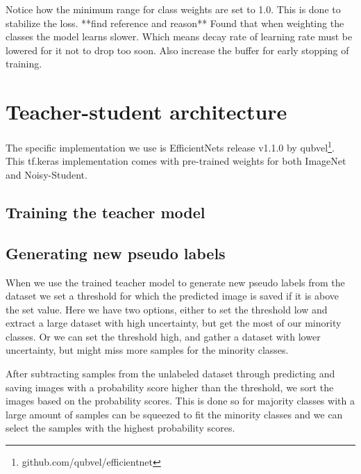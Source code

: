\documentclass[thesis.tex]{subfiles}
\begin{document}
Notice how the minimum range for class weights are set to 1.0. This is done to stabilize the loss. **find reference and reason**
Found that when weighting the classes the model learns slower. Which means decay rate of learning rate must be lowered for it not to drop too soon. Also increase the buffer for early stopping of training.








\section{Teacher-student architecture}

The specific implementation we use is EfficientNets release v1.1.0 by qubvel\footnote{github.com/qubvel/efficientnet}. This tf.keras implementation comes with pre-trained weights for both ImageNet and Noisy-Student.





\subsection{Training the teacher model}






\subsection{Generating new pseudo labels}
When we use the trained teacher model to generate new pseudo labels from the dataset we set a threshold for which the predicted image is saved if it is above the set value. Here we have two options, either to set the threshold low and extract a large dataset with high uncertainty, but get the most of our minority classes. Or we can set the threshold high, and gather a dataset with lower uncertainty, but might miss more samples for the minority classes.

After subtracting samples from the unlabeled dataset through predicting and saving images with a probability score higher than the threshold, we sort the images based on the probability scores. This is done so for majority classes with a large amount of samples can be squeezed to fit the minority classes and we can select the samples with the highest probability scores.
\end{document}
